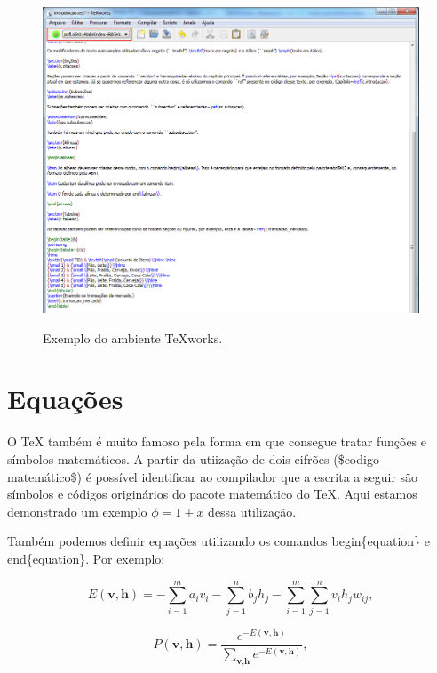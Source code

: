 \begin{figure}[h]
\caption{\small Exemplo do ambiente TeXworks.}
\centering
\includegraphics[scale=0.50]{figs/tex_exemplo.png}
\label{f.disposicao_mercado}
\end{figure}

\section{Equações}
\label{s.equacoes}

O TeX também é muito famoso pela forma em que consegue tratar funções e símbolos matemáticos. A partir da utiização de dois cifrões (\$codigo matemático\$) é possível identificar ao compilador que a escrita a seguir são símbolos e códigos originários do pacote matemático do TeX. Aqui estamos demonstrado um exemplo $\phi = 1 + x$ dessa utilização.

Também podemos definir equações utilizando os comandos begin\{equation\} e end\{equation\}. Por exemplo:

\begin{equation}
\label{e.energy_rbm}
E(\textbf{v},\textbf{h})=-\sum_{i=1}^ma_iv_i-\sum_{j=1}^nb_jh_j-\sum_{i=1}^m\sum_{j=1}^nv_ih_jw_{ij},
\end{equation}

\begin{equation}
\label{e.probability_configuration}
P(\textbf{v},\textbf{h})=\frac{e^{-E(\textbf{v},\textbf{h})}}{\displaystyle\sum_{\textbf{v},\textbf{h}}e^{-E(\textbf{v},\textbf{h})}},
\end{equation}

